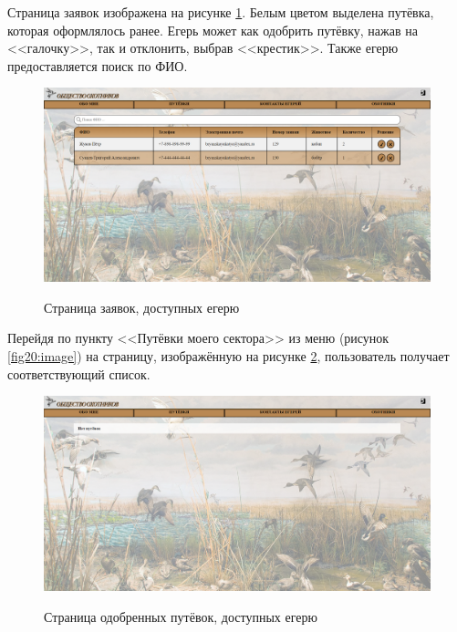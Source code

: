 	Страница заявок изображена на рисунке \ref{fig21:image}. Белым цветом выделена путёвка, которая оформлялось ранее. Егерь может как одобрить путёвку, нажав на <<галочку>>, так и отклонить, выбрав <<крестик>>. Также егерю предоставляется поиск по ФИО.

	\begin{figure}[h]
		\centering
		\begin{center}
			{\includegraphics[scale=0.321]{schemes/screens/requests_huntsman.png}}
			\caption{Страница заявок, доступных егерю}
			\label{fig21:image}
		\end{center}
	\end{figure}

	Перейдя по пункту <<Путёвки моего сектора>> из меню (рисунок \ref{fig20:image}) на страницу, изображённую на рисунке \ref{fig23:image}, пользователь получает соответствующий список.
	
	\begin{figure}[h]
		\centering
		\begin{center}
			{\includegraphics[scale=0.34]{schemes/screens/vouchers_huntsman2.png}}
			\caption{Страница одобренных путёвок, доступных егерю}
			\label{fig23:image}
		\end{center}
	\end{figure}
	\newpage

